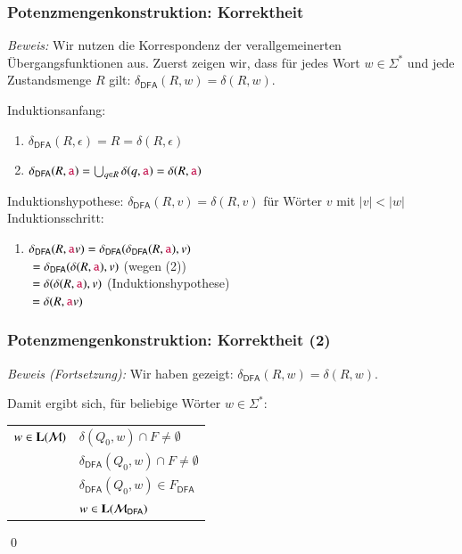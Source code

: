 \documentclass[onlymath]{beamer}
\begin{document}
\begin{frame}[t]\frametitle{Potenzmengenkonstruktion: Korrektheit}


\emph{Beweis:} Wir nutzen die Korrespondenz der verallgemeinerten Übergangsfunktionen aus. Zuerst zeigen wir,
dass für jedes Wort $w\in\Sigma^*$ und jede Zustandsmenge $R$ gilt: $\delta_{\textsf{DFA}}(R,w) = \delta(R,w)$.\pause
\medskip

\alert{Induktionsanfang:}
\begin{enumerate}[(1)]
\item $\delta_{\textsf{DFA}}(R,\epsilon) = R = \delta(R,\epsilon)$\pause
\item $\delta_{\textsf{DFA}}(R,\mathtt{\textcolor{purple}{a}}) = \bigcup_{q\in R}\delta(q,\mathtt{\textcolor{purple}{a}}) = \delta(R,\mathtt{\textcolor{purple}{a}})$\pause
\end{enumerate}\medskip

\alert{Induktionshypothese:} $\delta_{\textsf{DFA}}(R,v) = \delta(R,v)$ für Wörter $v$ mit $|v|<|w|$\\[1ex]
\alert{Induktionsschritt:}
\begin{enumerate}[(3)]
\item $\delta_{\textsf{DFA}}(R,\mathtt{\textcolor{purple}{a}}v) = \delta_{\textsf{DFA}}(\delta_{\textsf{DFA}}(R,\mathtt{\textcolor{purple}{a}}),v)$\\\pause
\hspace{1.58cm}${}= \delta_{\textsf{DFA}}(\delta(R,\mathtt{\textcolor{purple}{a}}),v)$ \hspace{1cm}(wegen (2))\\\pause
\hspace{1.58cm}${}= \delta(\delta(R,\mathtt{\textcolor{purple}{a}}),v)$ \hspace{1.45cm}(Induktionshypothese)\\\pause
\hspace{1.58cm}${}= \delta(R,\mathtt{\textcolor{purple}{a}}v)$
\end{enumerate}

\end{frame}

\begin{frame}[t]\frametitle{Potenzmengenkonstruktion: Korrektheit (2)}


\emph{Beweis (Fortsetzung):} Wir haben gezeigt: $\delta_{\textsf{DFA}}(R,w) = \delta(R,w)$.\pause
\medskip

Damit ergibt sich, für beliebige Wörter $w\in\Sigma^*$:\medskip

\begin{tabular}{l@{~~~ gdw. ~~~}l}
$w\in \textbf{\textcolor{black}{L}}(\mathcal{M})$ & \pause$\delta(Q_0,w)\cap F \neq \emptyset$ \\\pause
	& $\delta_{\textsf{DFA}}(Q_0,w)\cap F \neq \emptyset$ \\\pause
	& $\delta_{\textsf{DFA}}(Q_0,w)\in F_{\textsf{DFA}}$ \\\pause
	& $w\in \textbf{\textcolor{black}{L}}(\mathcal{M}_{\textsf{DFA}})$
\end{tabular}

\qed

\end{frame}
\end{document}
